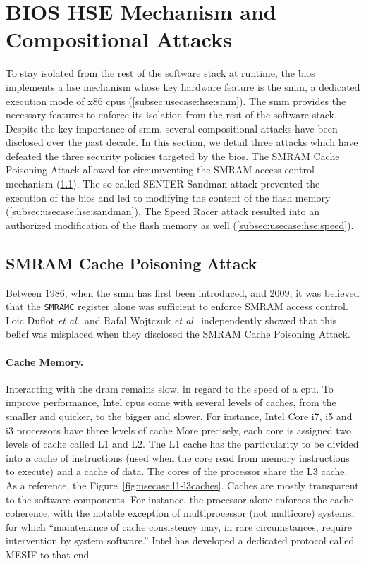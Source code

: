 \section{BIOS HSE Mechanism and Compositional Attacks}
\label{sec:usecase:hse}

To stay isolated from the rest of the software stack at runtime, the \ac{bios}
implements a \ac{hse} mechanism whose key hardware feature is the \ac{smm}, a
dedicated execution mode of x86 \acp{cpu} (\ref{subsec:usecase:hse:smm}).
%
The \ac{smm} provides the necessary features to enforce its isolation from the
rest of the software stack.
%
Despite the key importance of \ac{smm}, several compositional attacks have been
disclosed over the past decade.
%
In this section, we detail three attacks which have defeated the three security
policies targeted by the \ac{bios}.
%
The SMRAM Cache Poisoning Attack allowed for
circumventing the SMRAM access control mechanism
(\ref{subsec:usecase:hse:smram}).
%
The so-called SENTER Sandman attack prevented
the execution of the \ac{bios} and led to modifying the content of the flash
memory (\ref{subsec:usecase:hse:sandman}).
%
The Speed Racer attack resulted into an authorized modification of the flash
memory as well (\ref{subsec:usecase:hse:speed}).

\subsection{SMRAM Cache Poisoning Attack} %
\label{subsec:usecase:hse:smram}

Between 1986, when the \ac{smm} has first been introduced, and 2009, it was
believed that the \texttt{SMRAMC} register alone was sufficient to enforce SMRAM
access control.
%
Loic Duflot \emph{et al.}\,\cite{duflot2009smram} and Rafal Wojtczuk \emph{et
  al.}\,\cite{wojtczuk2009smram} independently showed that this belief was
misplaced when they disclosed the SMRAM Cache Poisoning Attack.

\paragraph{Cache Memory.}
%
Interacting with the \ac{dram} remains slow, in regard to the speed of a
\ac{cpu}.
%
To improve performance, Intel \acp{cpu} come with several levels of caches, from
the smaller and quicker, to the bigger and slower.
%
For instance, Intel Core i7, i5 and i3 processors have three levels of cache
%
More precisely, each core is assigned two levels of cache called L1 and L2.
%
The L1 cache has the particularity to be divided into a cache of instructions
(used when the core read from memory instructions to execute) and a cache of
data.
%
The cores of the processor share the L3 cache.
%
As a reference, the Figure~\ref{fig:usecase:l1-l3caches}.
%
Caches are mostly transparent to the software components.
%
For instance, the processor alone enforces the cache coherence, with
the notable exception of multiprocessor (not multicore) systems, for which
``maintenance of cache consistency may, in rare circumstances, require
intervention by system software.''
%
Intel has developed a dedicated protocol called MESIF to that
end\,\cite{thomadakis2011nehalem}.

